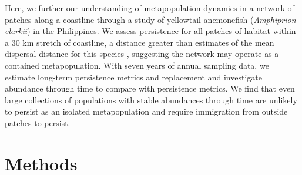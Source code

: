 \documentclass[12pt, oneside]{article}   	%
\begin{document}


Here, we further our understanding of metapopulation dynamics in a network of patches along a coastline through a study of yellowtail anemonefish (\textit{Amphiprion clarkii}) in the Philippines. We assess persistence for all patches of habitat within a 30 km stretch of coastline, a distance greater than estimates of the mean dispersal distance for this species \citep{pinsky2010using}, suggesting the network may operate as a contained metapopulation. With seven years of annual sampling data, we estimate long-term persistence metrics and replacement and investigate abundance through time to compare with persistence metrics. We find that even large collections of populations with stable abundances through time are unlikely to persist as an isolated metapopulation and require immigration from outside patches to persist.%

\section*{Methods} 
\end{document}
